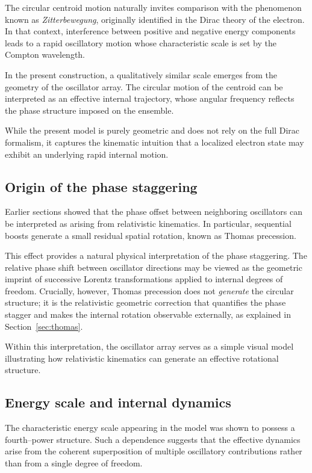 \documentclass[%
 reprint, amsmath,amssymb, aps, prb, ]{revtex4-2}
\numberwithin{equation}{section}
\begin{document}
The circular centroid motion naturally invites comparison with the phenomenon known as \emph{Zitterbewegung}, originally identified in the Dirac theory of the electron. In that context, interference between positive and negative energy components leads to a rapid oscillatory motion whose characteristic scale is set by the Compton wavelength.

In the present construction, a qualitatively similar scale emerges from the geometry of the oscillator array. The circular motion of the centroid can be interpreted as an effective internal trajectory, whose angular frequency reflects the phase structure imposed on the ensemble.

While the present model is purely geometric and does not rely on the full Dirac formalism, it captures the kinematic intuition that a localized electron state may exhibit an underlying rapid internal motion.

\subsection{Origin of the phase staggering}

Earlier sections showed that the phase offset between neighboring oscillators can be interpreted as arising from relativistic kinematics. In particular, sequential boosts generate a small residual spatial rotation, known as Thomas precession.

This effect provides a natural physical interpretation of the phase staggering. The relative phase shift between oscillator directions may be viewed as the geometric imprint of successive Lorentz transformations applied to internal degrees of freedom. Crucially, however, Thomas precession does not \emph{generate} the circular structure; it is the relativistic geometric correction that quantifies the phase stagger and makes the internal rotation observable externally, as explained in Section~\ref{sec:thomas}.

Within this interpretation, the oscillator array serves as a simple visual model illustrating how relativistic kinematics can generate an effective rotational structure.

\subsection{Energy scale and internal dynamics}

The characteristic energy scale appearing in the model was shown to possess a fourth--power structure. Such a dependence suggests that the effective dynamics arise from the coherent superposition of multiple oscillatory contributions rather than from a single degree of freedom.
\end{document}
